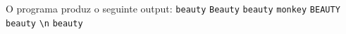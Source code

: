 \documentclass[12pt,varwidth=16cm,border=1pt]{standalone}
\begin{document}
O programa produz o seguinte output: 
\newline
\verb+beauty+ \newline
\verb+Beauty+ \newline
\verb+beauty+ \verb+monkey+ \newline
\verb+BEAUTY+ \newline
\verb+beauty+ \newline
\verb+\n+     \newline
\verb+beauty+
\end{document}
